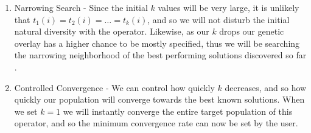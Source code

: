 \begin{enumerate}

\item Narrowing Search - Since the initial $k$ values will be very large, it is unlikely that $t_1(i) = t_2(i) = \ldots = t_k(i)$, and so we will not disturb the initial natural diversity with the operator.  Likewise, as our $k$ drops our genetic overlay has a higher chance to be mostly specified, thus we will be searching the narrowing neighborhood of the best performing solutions discovered so far \cite{Neri11}.

\item Controlled Convergence - We can control how quickly $k$ decreases, and so how quickly our population will converge towards the best known solutions. When we set $k=1$ we will instantly converge the entire target population of this operator, and so the minimum convergence rate can now be set by the user.


\end{enumerate}

